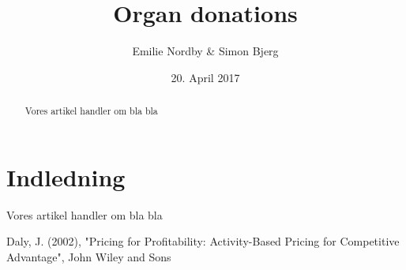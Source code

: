 \documentclass[a4paper,12pt]{article}
\title{Organ donations}
\author{Emilie Nordby \& Simon Bjerg}
\date{20. April 2017}
\begin{document}
\maketitle
\newpage
\begin{abstract}


Vores artikel handler om bla bla 

\end{abstract}	
\newpage
\tableofcontents

\newpage
\section{Indledning}

Vores artikel handler om bla bla



\newpage
\begin{thebibliography}{9}

Daly, J. (2002), "Pricing for Profitability: Activity-Based Pricing for Competitive Advantage", John Wiley and Sons




\end{thebibliography}	
	
\end{document}
